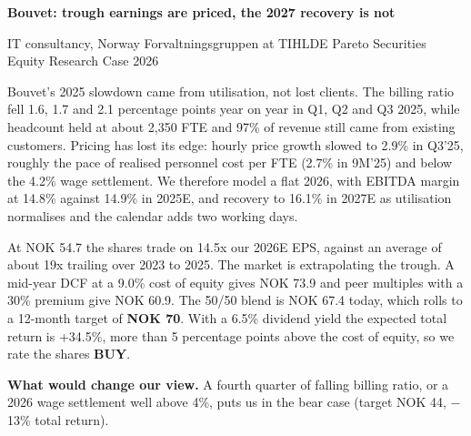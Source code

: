 \documentclass[10pt,a4paper]{article}
\begin{document}
{\color{navy}\Large\bfseries Bouvet: trough earnings are priced, the 2027 recovery is not}\par
\vspace{2pt}
{\color{ink2}IT consultancy, Norway \textbar{} Forvaltningsgruppen at TIHLDE \textbar{} Pareto Securities Equity Research Case 2026}

\vspace{4pt}
\begin{minipage}[t]{0.63\textwidth}
\vspace{0pt}
\setlength{\parskip}{5pt}
Bouvet's 2025 slowdown came from utilisation, not lost clients. The billing ratio fell 1.6, 1.7 and 2.1 percentage points year on year in Q1, Q2 and Q3 2025, while headcount held at about 2,350 FTE and 97\% of revenue still came from existing customers. Pricing has lost its edge: hourly price growth slowed to 2.9\% in Q3'25, roughly the pace of realised personnel cost per FTE (2.7\% in 9M'25) and below the 4.2\% wage settlement. We therefore model a flat 2026, with EBITDA margin at 14.8\% against 14.9\% in 2025E, and recovery to 16.1\% in 2027E as utilisation normalises and the calendar adds two working days.

At NOK 54.7 the shares trade on 14.5x our 2026E EPS, against an average of about 19x trailing over 2023 to 2025. The market is extrapolating the trough. A mid-year DCF at a 9.0\% cost of equity gives NOK 73.9 and peer multiples with a 30\% premium give NOK 60.9. The 50/50 blend is NOK 67.4 today, which rolls to a 12-month target of \textbf{NOK 70}. With a 6.5\% dividend yield the expected total return is +34.5\%, more than 5 percentage points above the cost of equity, so we rate the shares \textbf{BUY}.

\textbf{What would change our view.} A fourth quarter of falling billing ratio, or a 2026 wage settlement well above 4\%, puts us in the bear case (target NOK 44, $-$13\% total return).
\end{minipage}\hfill
\end{document}
